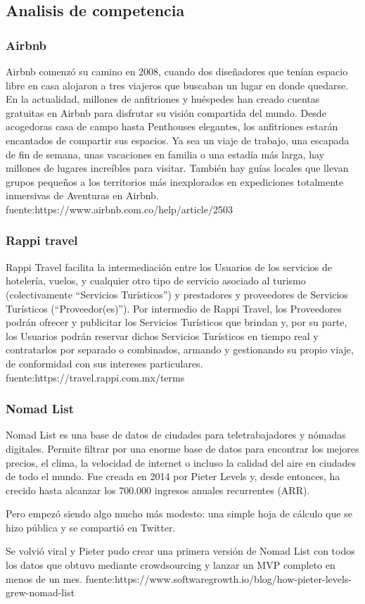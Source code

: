 \subsection{Analisis de competencia}

\subsubsection*{Airbnb}
Airbnb comenzó su camino en 2008, cuando dos diseñadores que tenían espacio libre en casa alojaron a tres viajeros que buscaban un lugar en donde quedarse. En la actualidad, millones de anfitriones y huéspedes han creado cuentas gratuitas en Airbnb para disfrutar su visión compartida del mundo.
Desde acogedoras casa de campo hasta Penthouses elegantes, los anfitriones estarán encantados de compartir sus espacios. Ya sea un viaje de trabajo, una escapada de fin de semana, unas vacaciones en familia o una estadía más larga, hay millones de lugares increíbles para visitar.
También hay guías locales que llevan grupos pequeños a los territorios más inexplorados en expediciones totalmente inmersivas de Aventuras en Airbnb.
fuente:https://www.airbnb.com.co/help/article/2503

\subsubsection*{Rappi travel}
Rappi Travel facilita la intermediación entre los Usuarios de los servicios de hotelería, vuelos, y cualquier otro tipo de servicio asociado al turismo (colectivamente “Servicios Turísticos”) y prestadores y proveedores de Servicios Turísticos (“Proveedor(es)”). Por intermedio de Rappi Travel, los Proveedores podrán ofrecer y publicitar los Servicios Turísticos que brindan y, por su parte, los Usuarios podrán reservar dichos Servicios Turísticos en tiempo real y contratarlos por separado o combinados, armando y gestionando su propio viaje, de conformidad con sus intereses particulares.
fuente:https://travel.rappi.com.mx/terms

\subsubsection*{Nomad List}
Nomad List es una base de datos de ciudades para teletrabajadores y nómadas digitales. Permite filtrar por una enorme base de datos para encontrar los mejores precios, el clima, la velocidad de internet o incluso la calidad del aire en ciudades de todo el mundo.
Fue creada en 2014 por Pieter Levels y, desde entonces, ha crecido hasta alcanzar los 700.000 ingresos anuales recurrentes (ARR).

Pero empezó siendo algo mucho más modesto: una simple hoja de cálculo que se hizo pública y se compartió en Twitter.

Se volvió viral y Pieter pudo crear una primera versión de Nomad List con todos los datos que obtuvo mediante crowdsourcing y lanzar un MVP completo en menos de un mes.
fuente:https://www.softwaregrowth.io/blog/how-pieter-levels-grew-nomad-list

